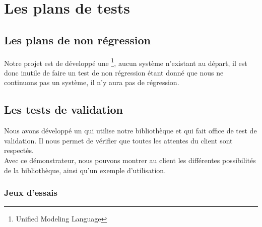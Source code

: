 \documentclass[12pt,a4paper,openany]{report}
\begin{document}
	\maketitle
	\newpage
	\setcounter{tocdepth}{3}
	\setcounter{secnumdepth}{3}
	
	\tableofcontents
	\newpage
	\chapter{Les plans de tests}
	\section{Les plans de non régression}
	Notre projet est de développé une   \footnote{Unified Modeling Language}, aucun système n'existant
	au départ, il est donc inutile de faire un test de non régression étant donné que nous ne continuons pas un système, il n'y aura pas 
	de régression.
	\section{Les tests de validation}
	Nous avons développé un  qui utilise notre bibliothèque et qui fait office de test de validation. Il nous permet de vérifier que toutes les attentes du client sont respectés. \\
		Avec ce démonstrateur, nous pouvons montrer au client les différentes possibilités de la bibliothèque, ainsi qu'un exemple d'utilisation.

		\subsection{Jeux d'essais}
\end{document}
